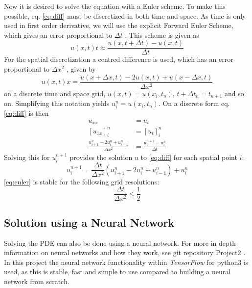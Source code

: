 \documentclass[a4paper,11pt,twocolumn]{article}
\begin{document}
Now it is desired to solve the equation with a Euler scheme. To make this possible, eq. \eqref{eq:diff} must be discretized in both time and space. As time is only used in first order derivative, we will use the explicit Forward Euler Scheme, which gives an error proportional to $\Delta t$ \cite{boyces}. This scheme is given as
\begin{equation}
  {u(x,t)}{t} \approx \frac{u(x,t+\Delta t) - u(x,t)}{\Delta t}
    \label{eq:foreward}
\end{equation}
For the spatial discretization a centred difference is used, which has an error proportional to $\Delta x^2$ \cite{boyces}, given by
\begin{equation}
 {u(x,t)}{x} = \frac{u(x+\Delta x,t) - 2u(x,t) + u(x-\Delta x,t)}{\Delta x^2}
    \label{eq:centerd}
\end{equation}
on a discrete time and space grid, $u(x,t) = u(x_i,t_n)$, $t+\Delta t_n = t_{n+1}$ and so on.
Simplifying this notation yields $u_i^n = u(x_i,t_n)$. On a discrete form eq. \eqref{eq:diff} is then 
\begin{equation}
\begin{split}
    u_{xx} &= u_t \\
    [u_{xx}]_i^n &= [u_t]_i^n \\
    \frac{u_{i+1}^n - 2u_i^n + u_{i-1}^n}{\Delta x^2} &= \frac{u_i^{n+1}-u_i^n}{\Delta t}
\end{split}
\end{equation}
Solving this for $u_i^{n+1}$ provides the solution $u$ to \eqref{eq:diff} for each spatial point $i$:
\begin{equation}
    u_i^{n+1} = \frac{\Delta t}{\Delta x^2}(u_{i+1}^n - 2u_i^n + u_{i-1}^n)  + u_i^n
    \label{eq:euler}
\end{equation}
\eqref{eq:euler} is stable for the following grid resolutions:
\begin{equation*}
    \frac{\Delta t}{\Delta x^2} \leq \frac{1}{2}
\end{equation*}


\subsection{Solution using a Neural Network}
Solving the PDE can also be done using a neural network. For more in depth information on neural networks and how they work, see git repository Project2 \cite{gitrepo}. In this project the neural network functionality within \textit{TensorFlow} for python3 is used, as this is stable, fast and simple to use compared to building a neural network from scratch. 
\end{document}
